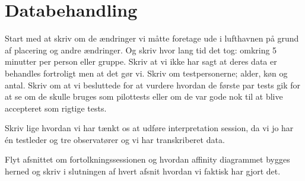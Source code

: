 \chapter{Databehandling}
\label{ParametreDatabehandling}
%
Start med at skriv om de ændringer vi måtte foretage ude i lufthavnen på grund af placering og andre ændringer. Og skriv hvor lang tid det tog: omkring 5 minutter per person eller gruppe. Skriv at vi ikke har sagt at deres data er behandles fortroligt men at det gør vi.  Skriv om testpersonerne; alder, køn og antal. Skriv om at vi besluttede for at vurdere hvordan de første par tests gik for at se om de skulle bruges som pilottests eller om de var gode nok til at blive accepteret som rigtige tests. 


Skriv lige hvordan vi har tænkt os at udføre interpretation session, da vi jo har én testleder og tre observatører og vi har transkriberet data. 

Flyt afsnittet om fortolkningssessionen og hvordan affinity diagrammet bygges herned og skriv i slutningen af hvert afsnit hvordan vi faktisk har gjort det. 



